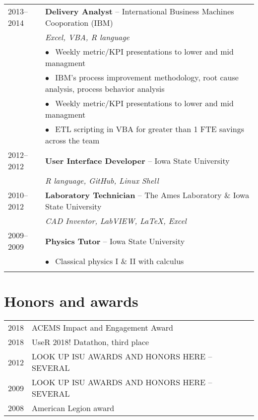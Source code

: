 \documentclass[10pt,a4paper,]{article}
\begin{document}
\begin{tabular}{ll}
  2013--2014 & \textbf{Delivery Analyst} -- International Business Machines Cooporation (IBM) \\ 
   & \textit{Excel, VBA, R language} \\ 
   & \hspace{5 mm} $\bullet~~$ Weekly metric/KPI presentations to lower and mid managment \\ 
   & \hspace{5 mm} $\bullet~~$ IBM’s process improvement methodology, root cause analysis, process behavior analysis \\ 
   & \hspace{5 mm} $\bullet~~$ Weekly metric/KPI presentations to lower and mid managment \\ 
   & \hspace{5 mm} $\bullet~~$ ETL scripting in VBA for greater than 1 FTE savings across the team \\ 
  2012--2012 & \textbf{User Interface Developer} -- Iowa State University \\ 
   & \textit{R language, GitHub, Linux Shell} \\ 
  2010--2012 & \textbf{Laboratory Technician} -- The Ames Laboratory \& Iowa State University \\ 
   & \textit{CAD Inventor, LabVIEW, LaTeX, Excel} \\ 
  2009--2009 & \textbf{Physics Tutor} -- Iowa State University \\ 
   & \hspace{5 mm} $\bullet~~$ Classical physics I \& II with calculus \\ 
   &  \\ 
  \end{tabular}

\hypertarget{honors-and-awards}{%
\section{Honors and awards}\label{honors-and-awards}}

\begin{tabular}{rl}
  2018 & ACEMS Impact and Engagement Award \\ 
  2018 & UseR 2018! Datathon, third place \\ 
  2012 & LOOK UP ISU AWARDS AND HONORS HERE -- SEVERAL \\ 
  2009 & LOOK UP ISU AWARDS AND HONORS HERE -- SEVERAL \\ 
  2008 & American Legion award \\ 
  \end{tabular}
\end{document}
